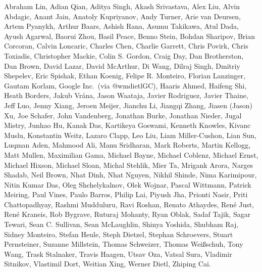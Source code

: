 Abraham Lin,
Adian Qian,
Aditya Singh,
Akash Srivastava,
Alex Liu,
Alvin Abdagic,
Anant Jain,
Anatoly Kupriyanov,
Andy Turner,
Arie van Deursen,
Artem Pyanykh,
Arthur Baars,
Ashish Rana,
Asumu Takikawa,
Atul Dada,
Ayush Agarwal,
Baorui Zhou,
Basil Peace,
Benno Stein,
Bohdan Sharipov,
Brian Corcoran,
Calvin Loncaric,
Charles Chen,
Charlie Garrett,
Chris Povirk,
Chris Toxiadis,
Christopher Mackie,
Colin S. Gordon,
Craig Day,
Dan Brotherston,
Dan Brown,
David Lazar,
David McArthur,
Di Wang,
Dilraj Singh,
Dmitriy Shepelev,
Eric Spishak,
Ethan Koenig,
Felipe R. Monteiro,
Florian Lanzinger,
Gautam Korlam,
Google Inc.\ (via @wmdietlGC),
Haaris Ahmed,
Haifeng Shi,
Heath Borders,
Jakub Vr\'ana,
Jason Waataja,
Javier Rodriguez,
Javier Thaine,
Jeff Luo,
Jenny Xiang,
Jeroen Meijer,
Jianchu Li,
Jiangqi Zhang,
Jiasen (Jason) Xu,
Joe Schafer,
John Vandenberg,
Jonathan Burke,
Jonathan Nieder,
Jugal Mistry,
Junhao Hu,
Kanak Das,
Kartikeya Goswami,
Kenneth Knowles,
Kivanc Muslu,
Konstantin Weitz,
Lazaro Clapp,
Leo Liu,
Liam Miller-Cushon,
Lian Sun,
Luqman Aden,
Mahmood Ali,
Manu Sridharan,
Mark Roberts,
Martin Kellogg,
Matt Mullen,
Maximilian Gama,
Michael Bayne,
Michael Coblenz,
Michael Ernst,
Michael Hixson,
Michael Sloan,
Michal Stehlik,
Mier Ta,
Mrigank Arora,
Narges Shadab,
Neil Brown,
Nhat Dinh,
Nhat Nguyen,
Nikhil Shinde,
Nima Karimipour,
Nitin Kumar Das,
Oleg Shchelykalnov,
Olek Wojnar,
Pascal Wittmann,
Patrick Meiring,
Paul Vines,
Paulo Barros,
Philip Lai,
Piyush Jha,
Prionti Nasir,
Priti Chattopadhyay,
Rashmi Mudduluru,
Ravi Roshan,
Renato Athaydes,
Ren\'e Just,
Ren\'e Kraneis,
Rob Bygrave,
Ruturaj Mohanty,
Ryan Oblak,
Sadaf Tajik,
Sagar Tewari,
Sean C. Sullivan,
Sean McLaughlin,
Shinya Yoshida,
Shubham Raj,
Sidney Monteiro,
Stefan Heule,
Steph Dietzel,
Stephan Schroevers,
Stuart Pernsteiner,
Suzanne Millstein,
Thomas Schweizer,
Thomas Wei\ss schuh,
Tony Wang,
Trask Stalnaker,
Travis Haagen,
Utsav Oza,
Vatsal Sura,
Vladimir Sitnikov,
Vlastimil Dort,
Weitian Xing,
Werner Dietl,
Zhiping Cai.
